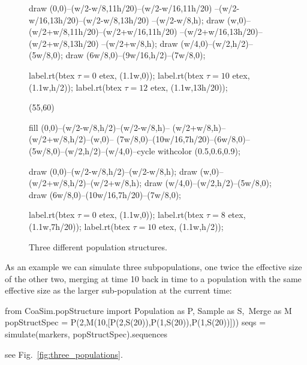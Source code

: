 \documentclass{manual}
\begin{document}
\begin{empfile}
\begin{figure}[tb]
\begin{empdef}
    draw (0,0)--(w/2-w/8,11h/20)--(w/2-w/16,11h/20)
         --(w/2-w/16,13h/20)--(w/2-w/8,13h/20)
         --(w/2-w/8,h);
    draw (w,0)--(w/2+w/8,11h/20)--(w/2+w/16,11h/20)
         --(w/2+w/16,13h/20)--(w/2+w/8,13h/20)
         --(w/2+w/8,h);
    draw (w/4,0)--(w/2,h/2)--(5w/8,0);
    draw (6w/8,0)--(9w/16,h/2)--(7w/8,0);

    label.rt(btex $\tau=0$ etex, (1.1w,0));
    label.rt(btex $\tau=10$ etex, (1.1w,h/2));
    label.rt(btex $\tau=12$ etex, (1.1w,13h/20));
  \end{empdef}
  \begin{empdef}(55,60)

    fill (0,0)--(w/2-w/8,h/2)--(w/2-w/8,h)--
         (w/2+w/8,h)--(w/2+w/8,h/2)--(w,0)--
         (7w/8,0)--(10w/16,7h/20)--(6w/8,0)--
         (5w/8,0)--(w/2,h/2)--(w/4,0)--cycle
         withcolor (0.5,0.6,0.9); %

    draw (0,0)--(w/2-w/8,h/2)--(w/2-w/8,h);
    draw (w,0)--(w/2+w/8,h/2)--(w/2+w/8,h);
    draw (w/4,0)--(w/2,h/2)--(5w/8,0);
    draw (6w/8,0)--(10w/16,7h/20)--(7w/8,0);

    label.rt(btex $\tau=0$ etex, (1.1w,0));
    label.rt(btex $\tau=8$ etex, (1.1w,7h/20));
    label.rt(btex $\tau=10$ etex, (1.1w,h/2));
  \end{empdef}

  \hspace*{.2cm}
  \hfill
  \hfill
  \hspace*{.2cm}

  \caption{Three different population structures.}
  \label{fig:population-structures}
\end{figure}

As an example we can simulate three subpopulations, one twice the
effective size of the other two, merging at time 10 back in time to a
population with the same effective size as the larger sub-population at
the current time:
\begin{code}
from CoaSim.popStructure import Population as P, Sample as S,\
                                Merge as M
popStructSpec = P(2,M(10,[P(2,S(20)),P(1,S(20)),P(1,S(20))]))
seqs = simulate(markers, popStructSpec).sequences
\end{code}
see Fig.~\ref{fig:three_populations}.


\end{empfile}
\end{document}
